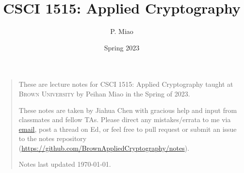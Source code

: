 \documentclass[letterpaper, 11pt, colorful, sections]{cs1515}
\title{CSCI 1515: Applied Cryptography}
\author{P. Miao}
\date{Spring 2023}
\numberwithin{equation}{section}
\begin{document}
\maketitle
\begin{quote}
    \quad These are lecture notes for CSCI 1515: Applied Cryptography taught at \textsc{Brown University} by Peihan Miao in the Spring of 2023.

    \quad These notes are taken by Jiahua Chen with gracious help and input from classmates and fellow TAs. Please direct any mistakes/errata to me via \href{mailto:jiahua_chen2@brown.edu}{email}, post a thread on Ed, or feel free to pull request or submit an issue to the notes repository (\url{https://github.com/BrownAppliedCryptography/notes}).

    \quad Notes last updated \today.
\end{quote}
\tableofcontents
% 
% 

\newpage






\end{document}
